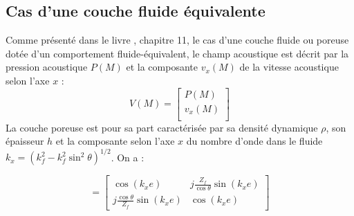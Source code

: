 \documentclass[12pt,foolscap]{report}
\begin{document}
	\subsection{Cas d'une couche fluide équivalente}
	Comme présenté dans le livre \cite{allard_propagation_2009}, chapitre 11, le cas d'une couche fluide ou poreuse dotée d'un comportement fluide-équivalent, le champ acoustique est décrit par la pression acoustique $P(M )$ et la composante $v_x (M )$ de la vitesse acoustique selon l'axe $x$ :
	\begin{equation}
	V(M)=\begin{bmatrix}
	P(M)\\
	v_x(M)\\
	\end{bmatrix}
	\end{equation}
	La couche poreuse est pour sa part caractérisée par sa densité dynamique $\rho$, son épaisseur $h$ et la composante
	selon l'axe $x$ du nombre d'onde dans le fluide $k_x= (k_f^2-k_f^2\sin^2\theta)^{1/2}$. On a :
	
	\begin{equation}
	[T_{fluide}] = \begin{bmatrix}
	\cos(k_xe) & j\frac{Z_f }{\cos\theta}\sin(k_xe)\\
	j\frac{\cos\theta}{Z_f }\sin(k_xe) &  \cos(k_xe)
	\end{bmatrix} 
	\end{equation}
	
\end{document}
